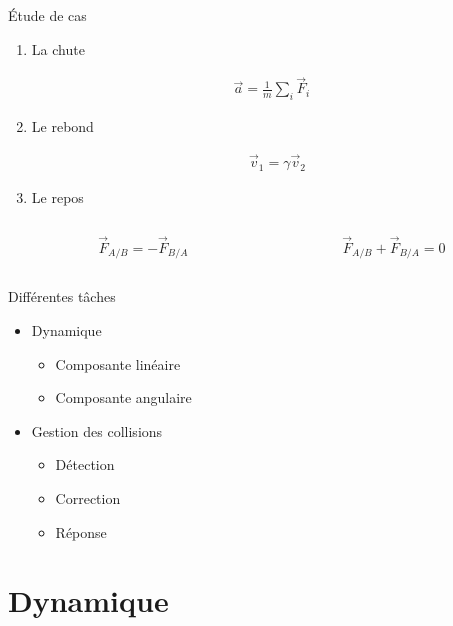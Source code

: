\documentclass{beamer}
\begin{document}
\begin{frame}{\'Etude de cas}
  \begin{enumerate}
  \item
    La chute

    \begin{align*}
      \vec{a} = \frac{1}{m} \sum_i \vec{F}_i
    \end{align*}
  \item
    Le rebond

    \begin{align*}
      &\vec{v}_1 = \gamma \vec{v}_2
    \end{align*}
  \item
    Le repos

    \begin{columns}
      \begin{column}{3cm}
        \[\vec{F}_{A/B} = -\vec{F}_{B/A}\]
      \end{column}
      \begin{column}{3cm}
        \[\vec{F}_{A/B} + \vec{F}_{B/A} = 0\]
      \end{column}
    \end{columns}
  \end{enumerate}
\end{frame}

\begin{frame}{Différentes tâches}
  \begin{itemize}
  \item Dynamique
    \begin{itemize}
    \item Composante linéaire
    \item Composante angulaire
    \end{itemize}

    \vfill

  \item Gestion des collisions
    \begin{itemize}
    \item Détection
    \item Correction
    \item Réponse
    \end{itemize}
  \end{itemize}
\end{frame}

\section{Dynamique}
\end{document}
